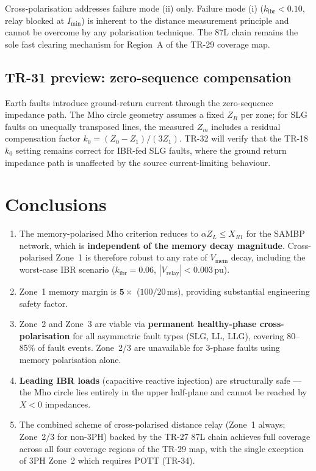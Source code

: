 \documentclass[11pt,a4paper]{article}
\begin{document}
Cross-polarisation addresses failure mode (ii) only.  Failure mode (i)
($k_\mathrm{ibr}<0.10$, relay blocked at $I_\mathrm{min}$) is inherent to the
distance measurement principle and cannot be overcome by any polarisation
technique.  The 87L chain remains the sole fast clearing mechanism for
Region~A of the TR-29 coverage map.

\subsection{TR-31 preview: zero-sequence compensation}

Earth faults introduce ground-return current through the zero-sequence impedance
path.  The Mho circle geometry assumes a fixed $Z_R$ per zone; for SLG faults on
unequally transposed lines, the measured $Z_m$ includes a residual compensation
factor $k_0 = (Z_0-Z_1)/(3Z_1)$.  TR-32 will verify that the TR-18 $k_0$ setting
remains correct for IBR-fed SLG faults, where the ground return impedance path
is unaffected by the source current-limiting behaviour.

\section{Conclusions}
\label{sec:conclusions}

\begin{enumerate}
  \item The memory-polarised Mho criterion reduces to $\alpha Z_L \leq X_{R1}$ for
        the SAMBP network, which is \textbf{independent of the memory decay
        magnitude}.  Cross-polarised Zone~1 is therefore robust to any rate of
        $V_\mathrm{mem}$ decay, including the worst-case IBR scenario ($k_\mathrm{ibr}=0.06$,
        $|V_\mathrm{relay}|<0.003$\,pu).
  \item Zone~1 memory margin is $\mathbf{5\times}$ ($100/20$\,ms), providing
        substantial engineering safety factor.
  \item Zone~2 and Zone~3 are viable via \textbf{permanent healthy-phase
        cross-polarisation} for all asymmetric fault types (SLG, LL, LLG),
        covering 80--85\% of fault events.  Zone~2/3 are unavailable for 3-phase
        faults using memory polarisation alone.
  \item \textbf{Leading IBR loads} (capacitive reactive injection) are
        structurally safe --- the Mho circle lies entirely in the upper
        half-plane and cannot be reached by $X<0$ impedances.
  \item The combined scheme of cross-polarised distance relay (Zone~1
        always; Zone~2/3 for non-3PH) backed by the TR-27 87L chain achieves
        full coverage across all four coverage regions of the TR-29 map,
        with the single exception of 3PH Zone~2 which requires POTT (TR-34).
\end{enumerate}



\end{document}
